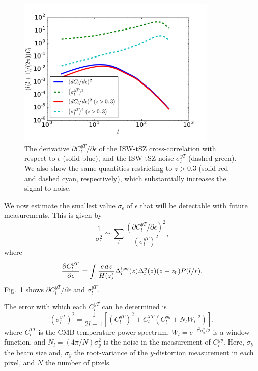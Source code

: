 \documentclass[aps,twocolumn,floats,prd,nofootinbib,10pt,floatfix]{revtex4-1}
\begin{document}
\begin{figure}[h]
\includegraphics[width=9.5cm, height = 7 cm]{Clbyeps.pdf}
\caption{The derivative $\partial C_l^{yT}/\partial \epsilon$ of
    the ISW-tSZ cross-correlation with respect to $\epsilon$
    (solid blue), and the ISW-tSZ noise $\sigma_l^{yT}$ (dashed
    green).  We also show the same quantities restricting to
    $z>0.3$ (solid red and dashed cyan, respectively),  
    which substantially increases the signal-to-noise.} 
\label{fig:clderiv}
\end{figure}

We now estimate the smallest value $\sigma_\epsilon$ of
$\epsilon$ that will be detectable with future measurements.
This is given by
\begin{equation}
     \frac{1}{\sigma_\epsilon^2} \simeq \sum_l \frac{ \left( \partial
     C_l^{yT}/\partial \epsilon \right)^2}{\left(\sigma_l^{yT} \right)^2},
\end{equation}
where
\begin{equation}
     \frac{\partial C_l^{yT}}{\partial \epsilon} = \int
     \frac{c\, dz}{H(z)} \Delta^{\rm isw}_l(z) \Delta^y_l(z)
     (z-z_0) P(l/r).
\label{eqn:Clderiv}
\end{equation}
Fig.~\ref{fig:clderiv} shows $\partial C_l^{yT}/\partial
\epsilon$ and $\sigma_l^{yT}$. 

The error with which each $C_l^{yT}$ can be determined is
\begin{equation}
     \left(\sigma_l^{yT} \right)^2 =\frac{1}{2l+1} \left[ \left(
     C_l^{yT} \right)^2 + C_l^{TT}\left(
     C_l^{yy} + N_lW_l^{-2} \right)\right],
\label{eqn:noise}
\end{equation}
where $C_l^{TT}$ is the CMB temperature power spectrum,
$W_l = e^{-l^2\sigma_b^2/2}$ is a window function, and $ N_l
= (4\pi/N)\sigma_y^2$ is the noise in the measurement of
$C_l^{yy}$.  Here, $\sigma_b$ the beam size and, $\sigma_y$ the
root-variance of the $y$-distortion measurement in each
pixel, and $N$ the number of pixels.
\end{document}
